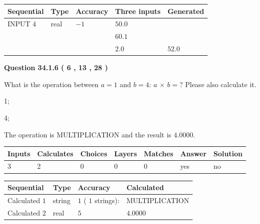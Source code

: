 \documentclass[12pt]{article}
\begin{document}
   
  
  
\noindent\begin{tabular}{|l|l|l|l|l|}
\hline
 Sequential & Type & Accuracy & Three inputs & Generated \\ 
\hline
 
 
  INPUT $            4 $ & real & $           -1  $ & $
 50.0
  $ & \\
  & & &  $
 60.1
  $ & \\
  & & &  $
 2.0
 $ & $ 52.0 $ 
 \\  \hline  
 \end{tabular}
   
   
  
\vspace{0.2in}
  
{\textbf{\Large{Question
34.1.6 
 (           6 ,          13 ,          28 )
}}}
  
  
What is the operation between $a= %
1$ and $b= %
4$:
$a$  %
$\times$ $b=?$ Please also calculate it.
 
 
\noindent{}
 
 

1;
 
4;
 
The operation is  %
MULTIPLICATION and the result is
$ %
4.0000$.
 
 
 
\noindent{}
 
 

 
\vspace{0.3in}
   
   
   
   
\noindent\begin{tabular}{|l|l|l|l|l|l|l|}
 \hline
Inputs & Calculates & Choices & Layers & Matches & Answer & Solution \\ \hline
           3  & 
           2  & 
           0
  & 
           0  & 
           0  & 
  yes & 
  no 
  \\ \hline
 \end{tabular}
   
   
   
   
\noindent{}
   
   
  
  
\noindent\begin{tabular}{|l|l|l|l|}
\hline
 Sequential & Type & Accuracy & Calculated \\ 
\hline
 
 
  Calculated $            1 $ & string & $            1  $ ( $           1  $ strings): 
 & MULTIPLICATION
 \\  \hline  
 
 
  Calculated $            2 $ & real & $            5  $ & 
 $ 4.0000 $ 
 \\  \hline  
 \end{tabular}
   
\end{document}
